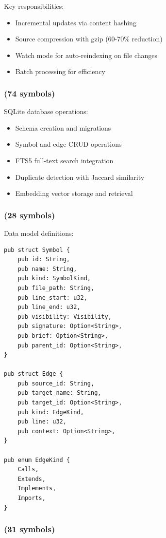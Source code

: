 Key responsibilities:
\begin{itemize}
    \item Incremental updates via content hashing
    \item Source compression with gzip (60-70\% reduction)
    \item Watch mode for auto-reindexing on file changes
    \item Batch processing for efficiency
\end{itemize}

\subsubsection{ (74 symbols)}

SQLite database operations:

\begin{itemize}
    \item Schema creation and migrations
    \item Symbol and edge CRUD operations
    \item FTS5 full-text search integration
    \item Duplicate detection with Jaccard similarity
    \item Embedding vector storage and retrieval
\end{itemize}

\subsubsection{ (28 symbols)}

Data model definitions:

\begin{lstlisting}[style=rustcode, caption={Core data models}]
pub struct Symbol {
    pub id: String,
    pub name: String,
    pub kind: SymbolKind,
    pub file_path: String,
    pub line_start: u32,
    pub line_end: u32,
    pub visibility: Visibility,
    pub signature: Option<String>,
    pub brief: Option<String>,
    pub parent_id: Option<String>,
}

pub struct Edge {
    pub source_id: String,
    pub target_name: String,
    pub target_id: Option<String>,
    pub kind: EdgeKind,
    pub line: u32,
    pub context: Option<String>,
}

pub enum EdgeKind {
    Calls,
    Extends,
    Implements,
    Imports,
}
\end{lstlisting}

\subsubsection{ (31 symbols)}

